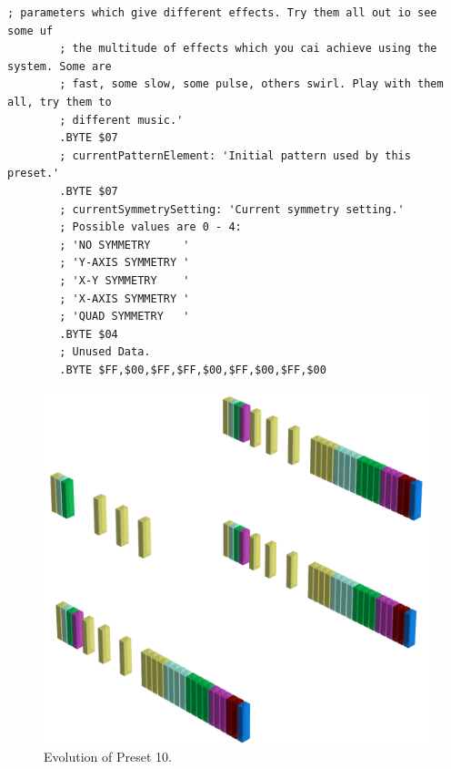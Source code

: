 \begin{lstlisting}[basicstyle=\ttfamily\tiny,caption=Source code for Preset 9.]
        ; parameters which give different effects. Try them all out io see some uf
        ; the multitude of effects which you cai achieve using the system. Some are
        ; fast, some slow, some pulse, others swirl. Play with them all, try them to
        ; different music.'
        .BYTE $07
        ; currentPatternElement: 'Initial pattern used by this preset.'
        .BYTE $07
        ; currentSymmetrySetting: 'Current symmetry setting.'
        ; Possible values are 0 - 4:
        ; 'NO SYMMETRY     '
        ; 'Y-AXIS SYMMETRY '
        ; 'X-Y SYMMETRY    '
        ; 'X-AXIS SYMMETRY '
        ; 'QUAD SYMMETRY   '
        .BYTE $04
        ; Unused Data.
        .BYTE $FF,$00,$FF,$FF,$00,$FF,$00,$FF,$00
\end{lstlisting}


\clearpage                                                                 
\begin{figure}[H]                                                          
    \centering                                                             
    \begin{adjustbox}{width=14cm,center}                                   
      \includegraphics[width=14cm]{src/presets/pattern10-45.png}%
    \end{adjustbox}                                                        
\caption{Evolution of Preset 10.}                                           
\end{figure}                                                               
\clearpage                                                                 
                                                                           
